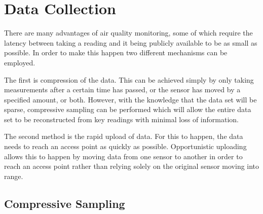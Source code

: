 \section{Data Collection}\label{datacollection}

There are many advantages of air quality monitoring, some of which require the latency between taking a reading and it being publicly available to be as small as possible. In order to make this happen two different mechanisms can be employed. 

The first is compression of the data. This can be achieved simply by only taking measurements after a certain time has passed, or the sensor has moved by a specified amount, or both. However, with the knowledge that the data set will be sparse, compressive sampling can be performed which will allow the entire data set to be reconstructed from key readings with minimal loss of information. 

The second method is the rapid upload of data. For this to happen, the data needs to reach an access point as quickly as possible. Opportunistic uploading allows this to happen by moving data from one sensor to another in order to reach an access point rather than relying solely on the original sensor moving into range. 

\subsection{Compressive Sampling}\label{compressivesampling} 



